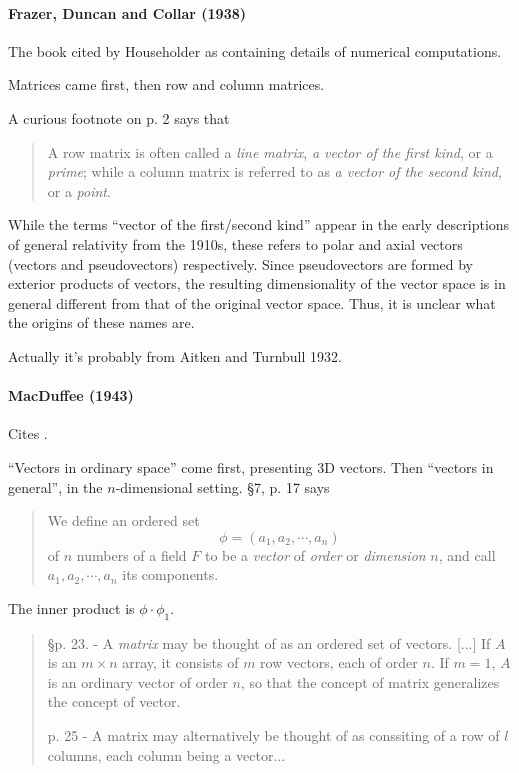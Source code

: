 \paragraph{Frazer, Duncan and Collar (1938)~\cite{Frazer1938}}

The book cited by Householder as containing details of numerical computations.

Matrices came first, then row and column matrices.

A curious footnote on p. 2 says that
\begin{quote}
    A row matrix is often called a \textit{line matrix}, \textit{a vector of the first kind},
    or a \textit{prime}; while a column matrix is referred to as \textit{a vector of the second kind}, or a \textit{point}.
\end{quote}

While the terms ``vector of the first/second kind'' appear in the early descriptions
of general relativity from the 1910s, these refers to polar and axial vectors
(vectors and pseudovectors) respectively. Since pseudovectors are formed by
exterior products of vectors, the resulting dimensionality of the vector space
is in general different from that of the original vector space.
Thus, it is unclear what the origins of these names are.

Actually it's probably from Aitken and Turnbull 1932.


\paragraph{MacDuffee (1943)~\cite{MacDuffee1943}}

Cites \cite{Wedderburn1934}.


``Vectors in ordinary space'' come first, presenting 3D vectors. Then ``vectors
in general'', in the $n$-dimensional setting. \S 7, p. 17 says

\begin{quote}
    We define an ordered set
    \[
        \phi = (a_1, a_2, \cdots, a_n)
    \]
    of $n$ numbers of a field $F$ to be a \textit{vector} of \textit{order} or
    \textit{dimension} $n$, and call $a_1, a_2, \cdots, a_n$ its components.
\end{quote}

The inner product is $\phi\cdot\phi_1$.

\begin{quote}
\S p. 23. - A \textit{matrix} may be thought of as an ordered set of vectors. [...]
If $A$ is an $m\times n$ array, it consists of $m$ row vectors, each of order $n$.
If $m=1$, $A$ is an ordinary vector of order $n$, so that the concept of matrix
generalizes the concept of vector.

p. 25 - A matrix may alternatively be thought of as conssiting of a row of $l$
columns, each column being a vector...
\end{quote}

